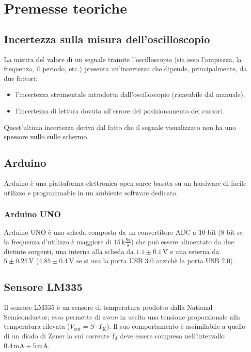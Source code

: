 \documentclass[a4paper]{article}
\begin{document}
	\section{Premesse teoriche}
		\subsection{Incertezza sulla misura dell'oscilloscopio}
			La misura del valore di un segnale tramite l’oscilloscopio (sia esso l'ampiezza, la frequenza, il periodo, etc.) presenta un'incertezza che dipende, principalmente, da due fattori:
			\begin{itemize}
				\item l’incertezza strumentale introdotta dall’oscilloscopio (ricavabile dal manuale).
				\item l’incertezza di lettura dovuta all’errore del posizionamento dei cursori.
			\end{itemize}
			Quest’ultima incertezza deriva dal fatto che il segnale visualizzato non ha uno spessore nullo sullo schermo.
		\subsection{Arduino}
			Arduino è una piattaforma elettronica open surce basata su un hardware di facile utilizzo e programmabie in un ambiente software dedicato.
			\subsubsection{Arduino UNO}
				Arduino UNO è una scheda composta da un convertitore ADC a $ 10 $ bit ($ 8 $ bit se la frequenza d'utilizzo è maggiore di $ 15 \, \mathrm{k\frac{Sa}{s}} $) che può essere alimentato da due distinte sorgenti, una interna alla scheda da $ 1.1 \pm 0.1 \, \mathrm{V} $ e una esterna da $ 5 \pm 0.25 \, \mathrm{V} $ ($ 4.85 \pm 0.4 \, \mathrm{V} $ se si usa la porta USB 3.0 anzichè la porta USB 2.0).
		\subsection{Sensore LM335}
			Il sensore LM335 è un sensore di temperatura prodotto dalla National Semiconductor; esso permette di avere in uscita una tensione proporzionale alla temperatura rilevata ($ V_{\mathrm{out}} = S \cdot T_{\mathrm{K}} $).
			\newline
			Il suo comportamento è assimilabile a quello di un diodo di Zener la cui corrente $ I_{\mathrm{d}} $ deve essere compresa nell'intervallo $ 0.4 \, \mathrm{mA} \div 5 \, \mathrm{mA} $.
\end{document}
